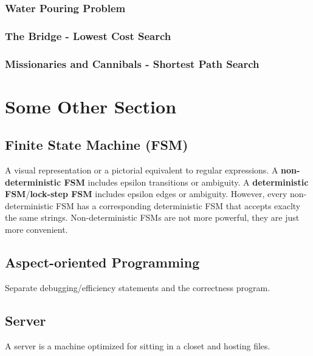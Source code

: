 \documentclass[12pt]{article}
\begin{document}
\subsubsection{Water Pouring Problem}




\subsubsection{The Bridge - Lowest Cost Search}




\subsubsection{Missionaries and Cannibals - Shortest Path Search}





\section{Some Other Section}

\subsection*{Finite State Machine (FSM)}
A visual representation or a pictorial equivalent to regular expressions. A \textbf{non-deterministic FSM} includes epsilon transitions or ambiguity. 
A \textbf{deterministic FSM}/\textbf{lock-step FSM} includes  epsilon edges or ambiguity. However, every non-deterministic FSM has a corresponding deterministic FSM that accepts exaclty the same strings. Non-deterministic FSMs are not more powerful, they are just more convenient.

\subsection{Aspect-oriented Programming}
Separate debugging/efficiency statements and the correctness program.

\subsection*{Server}
A server is a machine optimized for sitting in a closet and hosting files.
\end{document}
